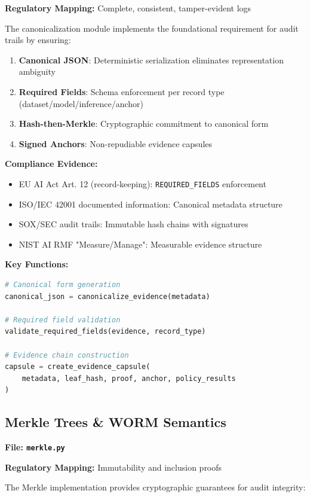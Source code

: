 \documentclass[11pt,a4paper]{article}
\begin{document}
\textbf{Regulatory Mapping:} Complete, consistent, tamper-evident logs

The canonicalization module implements the foundational requirement for audit trails by ensuring:

\begin{enumerate}
    \item \textbf{Canonical JSON}: Deterministic serialization eliminates representation ambiguity
    \item \textbf{Required Fields}: Schema enforcement per record type (dataset/model/inference/anchor)
    \item \textbf{Hash-then-Merkle}: Cryptographic commitment to canonical form
    \item \textbf{Signed Anchors}: Non-repudiable evidence capsules
\end{enumerate}

\textbf{Compliance Evidence:}
\begin{itemize}
    \item EU AI Act Art. 12 (record-keeping): \texttt{REQUIRED\_FIELDS} enforcement
    \item ISO/IEC 42001 documented information: Canonical metadata structure
    \item SOX/SEC audit trails: Immutable hash chains with signatures
    \item NIST AI RMF "Measure/Manage": Measurable evidence structure
\end{itemize}

\textbf{Key Functions:}
\begin{lstlisting}[language=Python]
# Canonical form generation
canonical_json = canonicalize_evidence(metadata)

# Required field validation
validate_required_fields(evidence, record_type)

# Evidence chain construction
capsule = create_evidence_capsule(
    metadata, leaf_hash, proof, anchor, policy_results
)
\end{lstlisting}

\subsection{Merkle Trees \& WORM Semantics}
\textbf{File: \texttt{merkle.py}}

\textbf{Regulatory Mapping:} Immutability and inclusion proofs

The Merkle implementation provides cryptographic guarantees for audit integrity:
\end{document}
